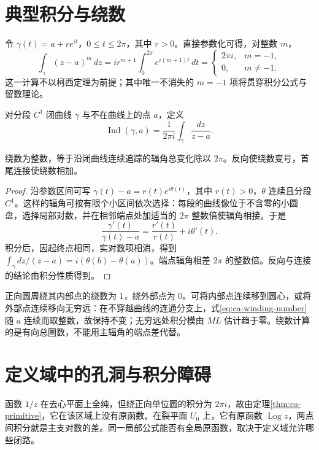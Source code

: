 \documentclass[UTF8,12pt,a4paper,fontset=fandol]{ctexbook}
\begin{document}
\section{典型积分与绕数}

令 $\gamma(t)=a+re^{it}$，$0\le t\le2\pi$，其中 $r>0$。直接参数化可得，对整数 $m$，
\begin{equation}
 \int_\gamma(z-a)^m\,dz
 =ir^{m+1}\int_0^{2\pi}e^{i(m+1)t}\,dt
 =\begin{cases}2\pi i,&m=-1,\\0,&m\ne-1.\end{cases}
 \label{eq:ca-circle-monomial}
\end{equation}
这一计算不以柯西定理为前提；其中唯一不消失的 $m=-1$ 项将贯穿积分公式与留数理论。

对分段 $C^1$ 闭曲线 $\gamma$ 与不在曲线上的点 $a$，定义
\begin{equation}
  \operatorname{Ind}(\gamma,a)=\frac{1}{2\pi i}\int_\gamma\frac{dz}{z-a}.
  \label{eq:ca-winding-number}
\end{equation}

\begin{proposition}
\label{prop:ca-winding-integer}
绕数为整数，等于沿闭曲线连续追踪的辐角总变化除以 $2\pi$。反向使绕数变号，首尾连接使绕数相加。
\end{proposition}
\begin{proof}
沿参数区间可写 $\gamma(t)-a=r(t)e^{i\theta(t)}$，其中 $r(t)>0$，$\theta$ 连续且分段 $C^1$。这样的辐角可按有限个小区间依次选择：每段的曲线像位于不含零的小圆盘，选择局部对数，并在相邻端点处加适当的 $2\pi$ 整数倍使辐角相接。于是
\[
 \frac{\gamma'(t)}{\gamma(t)-a}=\frac{r'(t)}{r(t)}+i\theta'(t).
\]
积分后，因起终点相同，实对数项相消，得到 $\int_\gamma dz/(z-a)=i(\theta(b)-\theta(a))$。端点辐角相差 $2\pi$ 的整数倍。反向与连接的结论由积分性质得到。
\end{proof}

正向圆周绕其内部点的绕数为 $1$，绕外部点为 $0$。可将内部点连续移到圆心，或将外部点连续移向无穷远：在不穿越曲线的连通分支上，式\eqref{eq:ca-winding-number} 随 $a$ 连续而取整数，故保持不变；无穷远处积分模由 $ML$ 估计趋于零。绕数计算的是有向总圈数，不能用主辐角的端点差代替。

\section{定义域中的孔洞与积分障碍}

函数 $1/z$ 在去心平面上全纯，但绕正向单位圆的积分为 $2\pi i$，故由定理\ref{thm:ca-primitive}，它在该区域上没有原函数。在裂平面 $U_0$ 上，它有原函数 $\operatorname{Log}z$，两点间积分就是主支对数的差。同一局部公式能否有全局原函数，取决于定义域允许哪些闭路。
\end{document}
